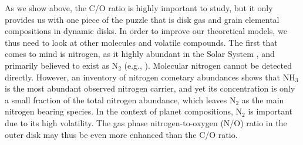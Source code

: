 
As we show above, the C/O ratio is highly important to study, but it only provides us with one piece of the puzzle that is disk gas and grain elemental compositions in dynamic disks. In order to improve our theoretical models, we thus need to look at other molecules and volatile compounds. The first that comes to mind is nitrogen, as it highly abundant in the Solar System \citep{lodders03}, and primarily believed to exist as N$_2$ (e.g., \citealt{owen01}). Molecular nitrogen cannot be detected directly. However, an inventory of nitrogen cometary abundances shows that NH$_3$ is the most abundant observed nitrogen carrier, and yet its concentration is only a small fraction of the total nitrogen abundance, which leaves N$_2$ as the main nitrogen bearing species. In the context of planet compositions, N$_2$ is important due to its high volatility. The gas phase
nitrogen-to-oxygen (N/O) ratio in the outer disk may thus be even more enhanced than the C/O ratio. %

%
%
%



